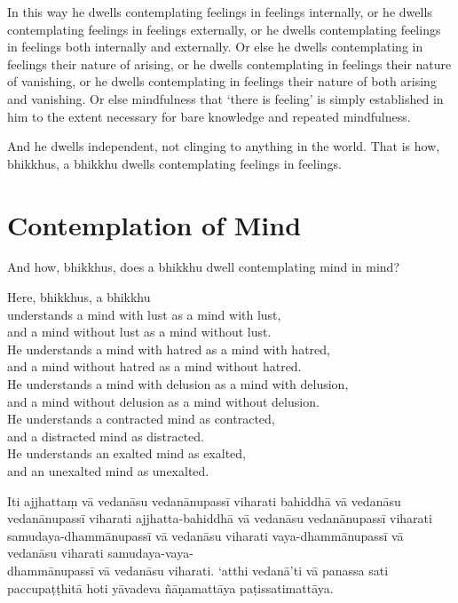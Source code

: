 \englishPage

In this way he dwells contemplating feelings in feelings internally, or he
dwells contemplating feelings in feelings externally, or he dwells contemplating
feelings in feelings both internally and externally. Or else he dwells
contemplating in feelings their nature of arising, or he dwells contemplating in
feelings their nature of vanishing, or he dwells contemplating in feelings their
nature of both arising and vanishing. Or else mindfulness that ‘there is
feeling’ is simply established in him to the extent necessary for bare knowledge
and repeated mindfulness.

And he dwells independent, not clinging to anything in the world. That is how,
bhikkhus, a bhikkhu dwells contemplating feelings in feelings.


\chapter{Contemplation of Mind}

And how, bhikkhus, does a bhikkhu dwell contemplating mind in mind?

Here, bhikkhus, a bhikkhu\\
understands a mind with lust as a mind with lust,\\
and a mind without lust as a mind without lust.\\
He understands a mind with hatred as a mind with hatred,\\
and a mind without hatred as a mind without hatred.\\
He understands a mind with delusion as a mind with delusion,\\
and a mind without delusion as a mind without delusion.\\
He understands a contracted mind as contracted,\\
and a distracted mind as distracted.\\
He understands an exalted mind as exalted,\\
and an unexalted mind as unexalted.

\paliPage

Iti ajjhattaṃ vā vedanāsu vedanānupassī viharati bahiddhā vā vedanāsu
vedanānupassī viharati ajjhatta-bahiddhā vā vedanāsu vedanānupassī viharati
samudaya-dhammānupassī vā vedanāsu viharati vaya-dhammānupassī vā vedanāsu
viharati samudaya-vaya-\\
dhammānupassī vā vedanāsu viharati. `atthi vedanā'ti vā panassa sati
paccupaṭṭhitā hoti yāvadeva ñāṇamattāya paṭissatimattāya.


